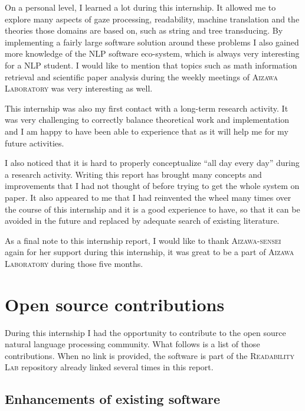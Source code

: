\documentclass[a4paper, 11pt, onepage]{scrreprt}
\begin{document}
On a personal level, I learned a lot during this internship. It
allowed me to explore many aspects of gaze processing, readability,
machine translation and the theories those domains are based on, such
as string and tree transducing. By implementing a fairly large
software solution around these problems I also gained more knowledge
of the NLP software eco-system, which is always very interesting for a
NLP student. I would like to mention that topics such as math
information retrieval and scientific paper analysis during the weekly
meetings of \textsc{Aizawa Laboratory} was very interesting as well.

This internship was also my first contact with a long-term research
activity. It was very challenging to correctly balance theoretical
work and implementation and I am happy to have been able to experience
that as it will help me for my future activities.

I also noticed that it is hard to properly conceptualize “all day
every day” during a research activity. Writing this report has brought
many concepts and improvements that I had not thought of before trying
to get the whole system on paper. It also appeared to me that I had
reinvented the wheel many times over the course of this internship and
it is a good experience to have, so that it can be avoided in the
future and replaced by adequate search of existing literature.

As a final note to this internship report, I would like to thank
\textsc{Aizawa-sensei} again for her support during this internship,
it was great to be a part of \textsc{Aizawa Laboratory} during those
five months.




\appendix

\chapter{Open source contributions}
\label{cha:oss-contribs}

During this internship I had the opportunity to contribute to the open
source natural language processing community. What follows is a list
of those contributions. When no link is provided, the software is part
of the \textsc{Readability Lab} repository already linked several
times in this report.

\section{Enhancements of existing software}
\label{sec:enhancements}
\end{document}
